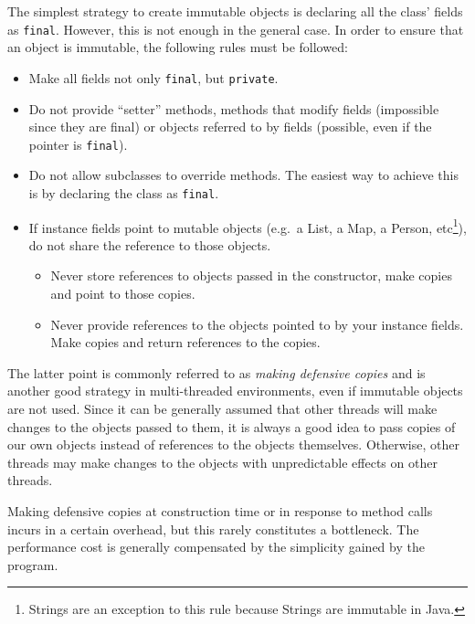 The simplest strategy to create immutable objects is declaring all the
class' fields as \verb+final+. However, this is not enough in the general
case. In order to ensure that an object is immutable, the following
rules must be followed: 

\begin{itemize}
\item Make all fields not only \verb+final+, but \verb+private+.
\item Do not provide ``setter'' methods, methods that modify fields
  (impossible since they are final) or objects referred to by fields
  (possible, even if the pointer is \verb+final+).
\item Do not allow subclasses to override methods. The easiest way to
  achieve this is by declaring the class as \verb+final+.
\item If instance fields point to mutable objects (e.g.~a List, 
  a Map, a Person, etc\footnote{Strings are an exception to this rule
    because Strings are immutable in Java.}),
  do not share the reference to those objects. 
  \begin{itemize}
  \item Never store references to objects passed in the constructor,
    make copies and point to those copies.
  \item Never provide references to the objects pointed to by your
    instance fields. Make copies and return references to the copies. 
  \end{itemize}
\end{itemize}

The latter point is commonly referred to as \emph{making defensive
  copies} and is another good strategy in multi-threaded environments,
even if immutable objects are not used. 
%
Since it can be generally assumed that other threads will make
changes to the objects passed to them, it is always a good idea to
pass copies of our own objects instead of references to the objects
themselves. Otherwise, other threads may make changes to the objects
with unpredictable effects on other threads. 

Making defensive copies at construction time or in response to method
calls incurs in a certain overhead, but this rarely constitutes a
bottleneck. The performance cost is generally compensated by the
simplicity gained by the program. 

